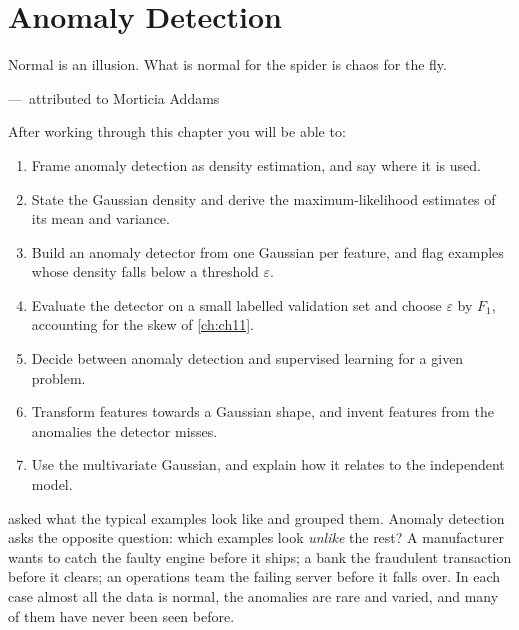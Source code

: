 
\chapter{Anomaly Detection}
\label{ch:ch14}

\epigraph{Normal is an illusion. What is normal for the spider is chaos for the
fly.}{---\ attributed to Morticia Addams}

\begin{chapterlearning}
After working through this chapter you will be able to:
\begin{enumerate}
  \item Frame anomaly detection as density estimation, and say where it is used.
  \item State the Gaussian density and derive the maximum-likelihood estimates
        of its mean and variance.
  \item Build an anomaly detector from one Gaussian per feature, and flag
        examples whose density falls below a threshold $\varepsilon$.
  \item Evaluate the detector on a small labelled validation set and choose
        $\varepsilon$ by $F_1$, accounting for the skew of \cref{ch:ch11}.
  \item Decide between anomaly detection and supervised learning for a given
        problem.
  \item Transform features towards a Gaussian shape, and invent features from the
        anomalies the detector misses.
  \item Use the multivariate Gaussian, and explain how it relates to the
        independent model.
\end{enumerate}
\end{chapterlearning}

 asked what the typical examples look like and grouped them.
Anomaly detection asks the opposite question: which examples look \emph{unlike}
the rest? A manufacturer wants to catch the faulty engine before it ships; a bank
the fraudulent transaction before it clears; an operations team the failing
server before it falls over. In each case almost all the data is normal, the
anomalies are rare and varied, and many of them have never been seen before.

